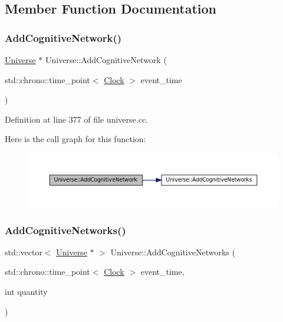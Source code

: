 \subsection{Member Function Documentation}
\mbox{\label{class_universe_ab682307c963836cd81b35b5604bd7064}} 
\subsubsection{\texorpdfstring{Add\+Cognitive\+Network()}{AddCognitiveNetwork()}}
{\footnotesize\ttfamily \mbox{\hyperlink{class_universe}{Universe}} $\ast$ Universe\+::\+Add\+Cognitive\+Network (\begin{DoxyParamCaption}\item[{std\+::chrono\+::time\+\_\+point$<$ \mbox{\hyperlink{universe_8h_a0ef8d951d1ca5ab3cfaf7ab4c7a6fd80}{Clock}} $>$}]{event\+\_\+time }\end{DoxyParamCaption})}



Definition at line 377 of file universe.\+cc.

Here is the call graph for this function\+:\nopagebreak
\begin{figure}[H]
\begin{center}
\leavevmode
\includegraphics[width=350pt]{class_universe_ab682307c963836cd81b35b5604bd7064_cgraph}
\end{center}
\end{figure}
\mbox{\label{class_universe_a5199f6c27b1a97c8b8c9847b8be686cf}} 
\subsubsection{\texorpdfstring{Add\+Cognitive\+Networks()}{AddCognitiveNetworks()}}
{\footnotesize\ttfamily std\+::vector$<$ \mbox{\hyperlink{class_universe}{Universe}} $\ast$ $>$ Universe\+::\+Add\+Cognitive\+Networks (\begin{DoxyParamCaption}\item[{std\+::chrono\+::time\+\_\+point$<$ \mbox{\hyperlink{universe_8h_a0ef8d951d1ca5ab3cfaf7ab4c7a6fd80}{Clock}} $>$}]{event\+\_\+time,  }\item[{int}]{quantity }\end{DoxyParamCaption})}



